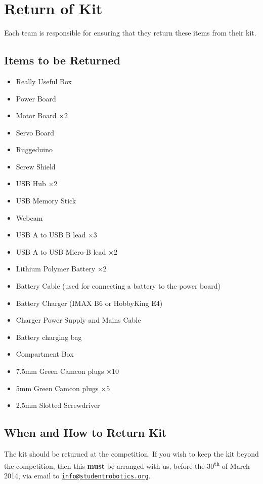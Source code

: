 \section {Return of Kit}
\label{sec:kit-return}

Each team is responsible for ensuring that they return these items from their kit.

\subsection {Items to be Returned}

\begin{itemize}
 \setlength{\itemsep}{0.3em}
 \item Really Useful Box

 \item Power Board
 \item Motor Board $\times 2$
 \item Servo Board
 \item Ruggeduino
 \item Screw Shield

 \item USB Hub $\times 2$
 \item USB Memory Stick
 \item Webcam
 \item USB A to USB B lead $\times 3$
 \item USB A to USB Micro-B lead $\times 2$

 \item Lithium Polymer Battery $\times 2$
 \item Battery Cable (used for connecting a battery to the power board)
 \item Battery Charger (IMAX B6 or HobbyKing E4)
 \item Charger Power Supply and Mains Cable
 \item Battery charging bag

 \item Compartment Box
 \item 7.5mm Green Camcon plugs $\times 10$
 \item 5mm Green Camcon plugs $\times 5$
 \item 2.5mm Slotted Screwdriver
\end{itemize}

\subsection {When and How to Return Kit}

The kit should be returned at the competition.
If you wish to keep the kit beyond the competition, then this \textbf{must} be arranged with us,
 before the 30\textsuperscript{th} of March 2014, via email to \href{mailto:info@studentrobotics.org}{\nolinkurl{info@studentrobotics.org}}.
